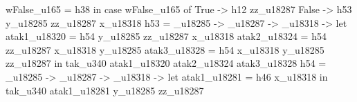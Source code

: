                                                                                                                                                                         wFalse_u165 = h38
                                                                                                                                                                      in case wFalse_u165 of
                                                                                                                                                                           True ->
                                                                                                                                                                             h12 zz_u18287
                                                                                                                                                                           False ->
                                                                                                                                                                             h53 y_u18285 zz_u18287 x_u18318
                                                                                                                        h53 = \y_u18285 -> \zz_u18287 -> \x_u18318 -> let
                                                                                                                                                                        atak1_u18320 = h54 y_u18285 zz_u18287 x_u18318
                                                                                                                                                                        atak2_u18324 = h54 zz_u18287 x_u18318 y_u18285
                                                                                                                                                                        atak3_u18328 = h54 x_u18318 y_u18285 zz_u18287
                                                                                                                                                                      in tak_u340 atak1_u18320 atak2_u18324 atak3_u18328
                                                                                                                        h54 = \y_u18285 -> \zz_u18287 -> \x_u18318 -> let
                                                                                                                                                                        atak1_u18281 = h46 x_u18318
                                                                                                                                                                      in tak_u340 atak1_u18281 y_u18285 zz_u18287
